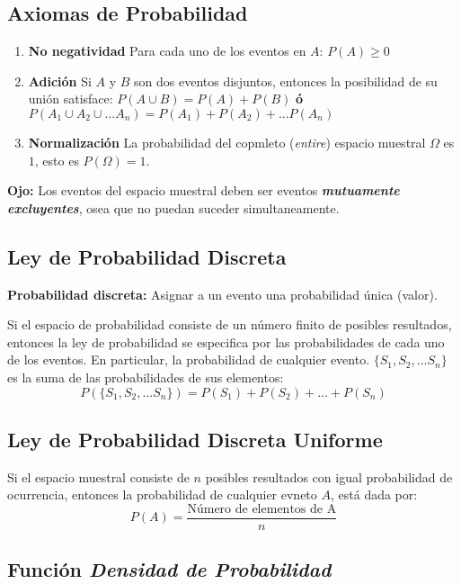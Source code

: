 \documentclass[]{book}
\providecommand{\tightlist}{%
  \setlength{\itemsep}{0pt}\setlength{\parskip}{0pt}}
\begin{document}
\subsection{Axiomas de Probabilidad}\label{axiomas-de-probabilidad}

\begin{enumerate}
\def\labelenumi{\arabic{enumi}.}
\tightlist
\item
  \textbf{No negatividad} Para cada uno de los eventos en \(A\):
  \(P(A) \geq 0\)
\item
  \textbf{Adición} Si \(A\) y \(B\) son dos eventos disjuntos, entonces
  la posibilidad de su unión satisface: \(P(A \cup B) = P(A)+P(B)\)
  \textbf{ó} \(P(A_1\cup A_2 \cup ...A_n) = P(A_1) + P(A_2)+...P(A_n)\)
\item
  \textbf{Normalización} La probabilidad del copmleto (\emph{entire})
  espacio muestral \(\Omega\) es \(1\), esto es \(P(\Omega) = 1\).
\end{enumerate}

 \textbf{Ojo:} Los eventos del espacio muestral deben ser eventos
\textbf{\emph{mutuamente excluyentes}}, osea que no puedan suceder
simultaneamente.

\subsection{Ley de Probabilidad
Discreta}\label{ley-de-probabilidad-discreta}

\textbf{Probabilidad discreta:} Asignar a un evento una probabilidad
única (valor).

Si el espacio de probabilidad consiste de un número finito de posibles
resultados, entonces la ley de probabilidad se especifica por las
probabilidades de cada uno de los eventos. En particular, la
probabilidad de cualquier evento. \(\{S_1,S_2,...S_n\}\) es la suma de
las probabilidades de sus elementos:
\[P(\{S_1,S_2,...S_n\}) = P(S_1)+P(S_2)+...+P(S_n)\]

\subsection{Ley de Probabilidad Discreta
Uniforme}\label{ley-de-probabilidad-discreta-uniforme}

Si el espacio muestral consiste de \(n\) posibles resultados con igual
probabilidad de ocurrencia, entonces la probabilidad de cualquier evneto
\(A\), está dada por:
\[P(A)= \frac{\text{Número de elementos de A}}{n}\]

\subsection{\texorpdfstring{Función \emph{Densidad de
Probabilidad}}{Función Densidad de Probabilidad}}\label{funcion-densidad-de-probabilidad}
\end{document}
